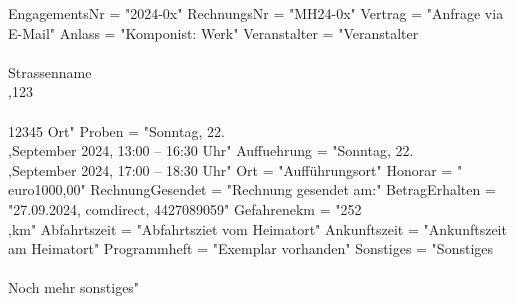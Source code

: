 \documentclass[11pt,a4paper,DIV=10]{scrartcl}
\begin{document}
\begin{luacode}
    EngagementsNr = "2024-0x"
    RechnungsNr = "MH24-0x"
    Vertrag = "Anfrage via E-Mail"
    Anlass = "Komponist: Werk"
    Veranstalter = "Veranstalter\\\\Strassenname\\,123\\\\12345 Ort"
    Proben = "Sonntag, 22.\\,September 2024, 13:00 -- 16:30 Uhr"
    Auffuehrung = "Sonntag, 22.\\,September 2024, 17:00 -- 18:30 Uhr"
    Ort = "Aufführungsort"
    Honorar = "\\euro{1000,00}"
    RechnungGesendet = "Rechnung gesendet am:"
    BetragErhalten = "27.09.2024, comdirect, 4427089059"
    Gefahrenekm = "252\\,km"
    Abfahrtszeit = "Abfahrtsziet vom Heimatort"
    Ankunftszeit = "Ankunftszeit am Heimatort"
    Programmheft = "Exemplar vorhanden"
    Sonstiges = "Sonstiges\\\\Noch mehr sonstiges"
\end{luacode}

\end{document}
